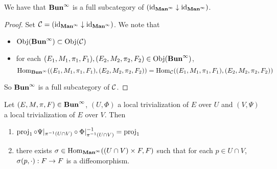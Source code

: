 \documentclass{book}
\begin{document}
	\begin{ex} 
		We have that $\Buninf$ is a full subcategory of $(\id_{\Maninf} \downarrow \id_{\Maninf})$.
	\end{ex}
	
	\begin{proof} Set $\MC = (\id_{\Maninf} \downarrow \id_{\Maninf})$. We note that 
		\begin{itemize}
			\item $\Obj(\Buninf) \subset \Obj(\MC)$
			\item for each $(E_1, M_1, \pi_1, F_1), (E_2, M_2, \pi_2, F_2) \in \Obj(\Buninf)$, 
			$$\Hom_{\Buninf}((E_1, M_1, \pi_1, F_1), (E_2, M_2, \pi_2, F_2)) = \Hom_{\MC}((E_1, M_1, \pi_1, F_1), (E_2, M_2, \pi_2, F_2))$$
		\end{itemize}
		So $\Buninf$ is a full subcategory of $\MC$.
	\end{proof}


	\begin{ex} 
		Let $(E, M, \pi, F) \in \Buninf$, $(U, \Phi)$ a local trivialization of $E$ over $U$ and $(V, \Psi)$ a local trivialization of $E$ over $V$. Then 
		\begin{enumerate}
			\item $\prj_1 \circ \Psi|_{\pi^{-1}(U \cap V)} \circ \Phi|^{-1}_{\pi^{-1}(U \cap V)} = \prj_1$
			\item there exists $\sig \in \Hom_{\Maninf}(( U \cap V) \times F,  F)$ such that for each $p \in U \cap V$, $\sig(p, \cdot): F \rightarrow F$ is a diffeomorphism.  
		\end{enumerate}
	\end{ex}
\end{document}
